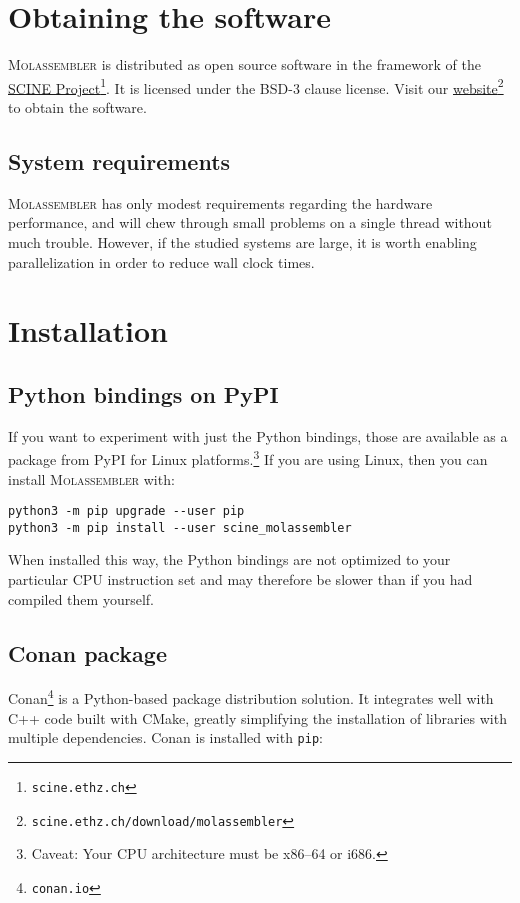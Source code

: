 \documentclass[]{tufte-book}
\begin{document}
\chapter{Obtaining the software}\label{ch:obtain}

\textsc{Molassembler}  is distributed as open source software in the framework
of the \href{https://scine.ethz.ch/}{SCINE
Project}\footnote{\texttt{scine.ethz.ch}}. It is licensed under the BSD-3 clause
license. Visit our
\href{https://scine.ethz.ch/download/molassembler}{website}\footnote{\texttt{scine.ethz.ch/download/molassembler}}
to obtain the software. 


\section{System requirements}

\textsc{Molassembler} has only modest requirements regarding the hardware
performance, and will chew through small problems on a single thread without
much trouble. However, if the studied systems are large, it is worth enabling
parallelization in order to reduce wall clock times.


\chapter{Installation}\label{ch:installation}

\section{Python bindings on PyPI}

If you want to experiment with just the Python bindings, those are available as
a package from PyPI for Linux platforms.\footnote{Caveat: Your CPU architecture
must be x86--64 or i686.} If you are using Linux, then you can install
\textsc{Molassembler} with:

\begin{Verbatim}
python3 -m pip upgrade --user pip
python3 -m pip install --user scine_molassembler
\end{Verbatim}

When installed this way, the Python bindings are not optimized to your
particular CPU instruction set and may therefore be slower than if you had
compiled them yourself.

\section{Conan package}
Conan\footnote{\texttt{conan.io}} is a Python-based package distribution
solution. It integrates well with C++ code built with CMake, greatly simplifying
the installation of libraries with multiple dependencies. Conan is installed
with \texttt{pip}:
\end{document}
